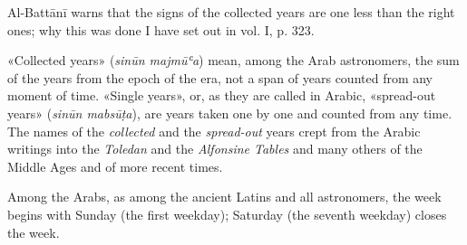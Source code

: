 \documentclass[11pt]{article}
\newcommand{\Pg}[1]{\marginpar{\footnotesize\color{gray}#1}}
\begin{document}
\par \Pg{II 199}Al-Battānī warns that the signs of the collected years are one less than the right ones; why this was done I have set out in vol. I, p. 323.\par
\par «Collected years» (\emph{sinūn majmūʿa}) mean, among the Arab astronomers, the sum of the years from the epoch of the era, not a span of years counted from any moment of time. «Single years», or, as they are called in Arabic, «spread-out years» (\emph{sinūn mabsūṭa}), are years taken one by one and counted from any time. The names of the \emph{collected} and the \emph{spread-out} years crept from the Arabic writings into the \emph{Toledan} and the \emph{Alfonsine Tables} and many others of the Middle Ages and of more recent times.\par
\par Among the Arabs, as among the ancient Latins and all astronomers, the week begins with Sunday (the first weekday); Saturday (the seventh weekday) closes the week.\par
\end{document}
